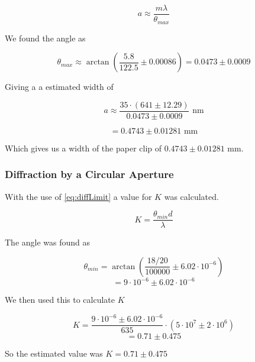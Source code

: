 \documentclass{emulateapj}
\begin{document}
\begin{equation}
a \approx \frac{m \lambda}{\theta_{max}}
\end{equation}

We found the angle as

\begin{equation}
\theta_{max} \approx \arctan\left(\frac{5.8}{122.5} \pm 0.00086\right) =0.0473 \pm 0.0009
\end{equation}

Giving a a estimated width of

\begin{equation}
a \approx \frac{35\cdot (641 \pm 12.29)}{0.0473 \pm 0.0009} \text{ nm}
\end{equation} 

\begin{equation}
= 0.4743 \pm 0.01281 \text{ mm}
\end{equation}\label{eq:widthPaperClip}

Which gives us a width of the paper clip of $0.4743 \pm 0.01281 \text{ mm}$.

\subsubsection{Diffraction by a Circular Aperture}

With the use of \eqref{eq:diffLimit} a value for $K$ was calculated.

\begin{equation}
K = \frac{\theta_{min} d}{\lambda}
\end{equation}

The angle was found as

\begin{equation}
\theta_{min} = \arctan\left(\frac{18/20}{100000} \pm 6.02\cdot 10^{-6} \right)
\end{equation}
\begin{equation}
= 9\cdot 10^{-6} \pm 6.02\cdot 10^{-6}
\end{equation}

We then used this to calculate $K$

\begin{equation}
K = \frac{9\cdot 10^{-6} \pm 6.02\cdot 10^{-6}}{635}\cdot(5\cdot10^7 \pm 2\cdot10^6)
\end{equation}
\begin{equation}
= 0.71 \pm 0.475
\end{equation}\label{eq:K}

So the estimated value was $K = 0.71 \pm 0.475$
\end{document}
